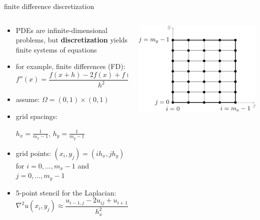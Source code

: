 \documentclass[10pt,
               svgnames,
               hyperref={colorlinks,citecolor=DeepPink4,linkcolor=FireBrick,urlcolor=Maroon},
               usepdftitle=false]{beamer}
\newcommand{\grad}{\nabla}
\begin{document}
\begin{frame}{finite difference discretization}
\begin{columns}
\begin{column}{0.7\textwidth}
\begin{itemize}
\item PDEs are infinite-dimensional problems, but \textbf{discretization} yields finite systems of equations
\item for example, finite differences (FD):
    $$f''(x) = \frac{f(x+h) - 2 f(x) + f(x-h)}{h^2} + O(h^2)$$
\item assume: $\Omega = (0,1) \times (0,1)$
\item grid spacings: \strut $h_x=\frac{1}{m_x-1}$, $h_y=\frac{1}{m_y-1}$
\item grid points: $(x_i,y_j) = (ih_x,jh_y)$ for $i=0,\dots,m_x-1$ and $j=0,\dots,m_y-1$
\item 5-point stencil for the Laplacian:
{\small
$$\grad^2 u(x_i,y_j) \approx \frac{u_{i-1,j} - 2 u_{ij} + u_{i+1,j}}{h_x^2} + \frac{u_{i,j-1} - 2 u_{ij} + u_{i,j+1}}{h_y^2}$$
}
\end{itemize}
\end{column}
\begin{column}{0.3\textwidth}
\hfill \includegraphics[width=\textwidth]{images/gridindexing.png}


\end{column}
\end{columns}
\end{frame}
\end{document}
